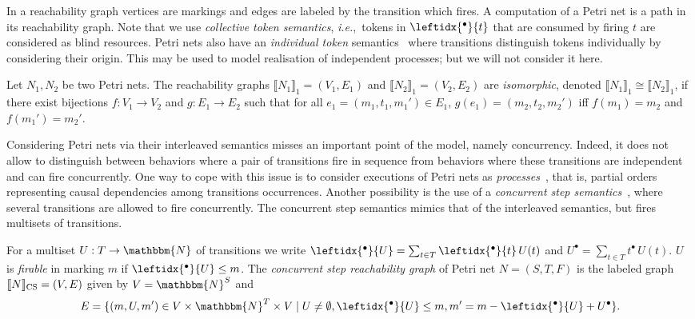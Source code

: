 \documentclass[runningheads,envcountsame]{llncs}
\newcommand*\ie{\textit{i.e.},}
\newcommand*\Nat{\mathbbm{N}}
\newcommand*\prepla[1]{\leftidx{^\bullet}{#1}}
\newcommand*\pospla[1]{#1^\bullet}
\newcommand*\sem[1]{\llbracket #1\rrbracket}
\begin{document}
In a reachability graph vertices are markings and edges are labeled by the transition which fires.
A computation of a Petri net is a path in its reachability graph.
Note that we use \emph{collective token semantics},
\ie~tokens in $\prepla{t}$ that are consumed by firing $t$ are considered as blind resources.
Petri nets also have an \emph{individual token} semantics~\cite{GR83} where transitions distinguish tokens individually by considering their origin.
This may be used to model realisation of independent processes; but we will not consider it here.

Let $N_1, N_2$ be two Petri nets.
The reachability graphs $\sem{N_1}_1=(V_1, E_1)$ and $\sem{N_2}_1=(V_2, E_2)$ are \emph{isomorphic}, denoted $\sem{N_1}_1 \cong \sem{N_2}_1$,
if there exist bijections $f:V_1\to V_2$ and $g:E_1\to E_2$ such that
for all $e_1=(m_1, t_1, m_1')\in E_1$, $g(e_1)=(m_2,t_2,m_2')$ iff $f(m_1)=m_2$ and $f(m_1')=m_2'$.

Considering Petri nets via their interleaved semantics
misses an important point of the model, namely concurrency. Indeed, it does not allow to distinguish between behaviors where a pair of transitions fire in sequence from behaviors where these transitions are independent and can fire concurrently. 
One way to cope with this issue is to consider executions of Petri nets as {\em processes}~\cite{GR83}, that is, partial orders representing causal dependencies among transitions occurrences. Another possibility is the 
use of a \emph{concurrent step semantics}~\cite{GLT80},
where several transitions are allowed to fire concurrently.
The concurrent step semantics mimics that of the interleaved semantics, but fires multisets of transitions.

For a multiset $U: T\to \Nat$ of transitions
we write $\prepla{U}=\sum_{t\in T} \prepla{t}\, U(t)$
and $\pospla{U}=\sum_{t\in T} \pospla{t}\, U(t)$.
$U$ is \emph{firable} in marking $m$ if $\prepla{U}\le m$. 
The \emph{concurrent step reachability graph} \cite{DBLP:journals/ijfcs/Mukund92}
of Petri net $N=(S, T, F)$ is the labeled graph $\sem{N}_{\textup{CS}}=(V, E)$ given by $V=\Nat^S$ and
\begin{equation}
  \label{eq_conc_def}
  E = \{(m, U, m')\in V\times \Nat^T\times V\mid U\ne \emptyset, \prepla{U}\le m, m'=m-\prepla{U}+\pospla{U}\}.
\end{equation}
\end{document}
